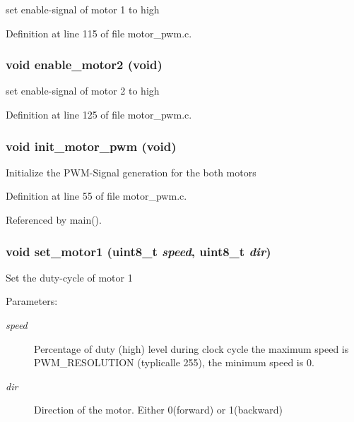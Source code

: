 set enable-signal of motor 1 to high 

Definition at line 115 of file motor\_\-pwm.c.
\subsubsection{\setlength{\rightskip}{0pt plus 5cm}void enable\_\-motor2 (void)\hspace{0.3cm}{\tt  [inline]}}\label{group__ro__motor__pwm_g252b80cfc7999924d68b2dd48c3ec242}


set enable-signal of motor 2 to high 

Definition at line 125 of file motor\_\-pwm.c.
\subsubsection{\setlength{\rightskip}{0pt plus 5cm}void init\_\-motor\_\-pwm (void)}\label{group__ro__motor__pwm_g37644f1449a77dae22f6b6eefaae6899}


Initialize the PWM-Signal generation for the both motors 

Definition at line 55 of file motor\_\-pwm.c.

Referenced by main().
\subsubsection{\setlength{\rightskip}{0pt plus 5cm}void set\_\-motor1 (uint8\_\-t {\em speed}, uint8\_\-t {\em dir})\hspace{0.3cm}{\tt  [inline]}}\label{group__ro__motor__pwm_g924cff55240daf42ea54e664f73f654e}


Set the duty-cycle of motor 1 \begin{Desc}
\item[Parameters:]
\begin{description}
\item[{\em speed}]Percentage of duty (high) level during clock cycle the maximum speed is PWM\_\-RESOLUTION (typlicalle 255), the minimum speed is 0. \item[{\em dir}]Direction of the motor. Either 0(forward) or 1(backward) \end{description}
\end{Desc}


